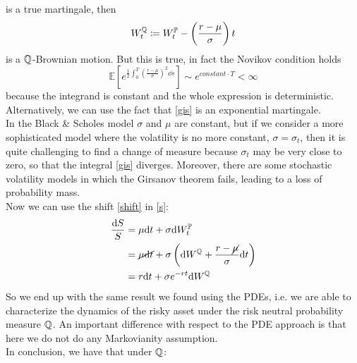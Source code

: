 is a true martingale, then 
\begin{equation}\label{shift}
    W^{\mathbb{Q}}_t \coloneqq W_t^{\mathbb{P}} - \left(\frac{r-\mu}{\sigma}\right)t 
\end{equation}
is a $\mathbb{Q}$-Brownian motion. But this is true, in fact the Novikov condition holds
\begin{equation}
    \mathbb{E}\left[e^{\frac{1}{2}\int^T_0\left(\frac{r-\mu}{\sigma}\right)^2\dd s}\right] \sim e^{constant\cdot T} < \infty
\end{equation}
because the integrand is constant and the whole expression is deterministic. Alternatively, we can use the fact that \eqref{gis} is an exponential martingale. \\
In the Black \& Scholes model $\sigma$ and $\mu$ are constant, but if we consider a more sophisticated model where the volatility is no more constant, $\sigma=\sigma_t$, then it is quite challenging to find a change of measure because $\sigma_t$ may be very close to zero, so that the integral \eqref{gis} diverges. Moreover, there are some stochastic volatility models in which the Girsanov theorem fails, leading to a loss of probability mass. \\
Now we can use the shift \eqref{shift} in \eqref{s}:
\begin{align}
    \notag \frac{\dd S}{S} &= \mu \dd t + \sigma \dd W_t^{\mathbb{P}}\\
    &=
    \cancel{\mu \dd t} + \sigma \left(\dd W^{\mathbb{Q}} + \frac{r-\cancel{\mu}}{\sigma}\dd t\right) \\
    &=
    r\dd t + \sigma e^{-rt}\dd W^{\mathbb{Q}} 
\end{align}
So we end up with the same result we found using the PDEs, i.e. we are able to characterize the dynamics of the risky asset under the risk neutral probability measure $\mathbb{Q}$. An important difference with respect to the PDE approach is that here we do not do any Markovianity assumption.\\
In conclusion, we have that under $\mathbb{Q}$:
